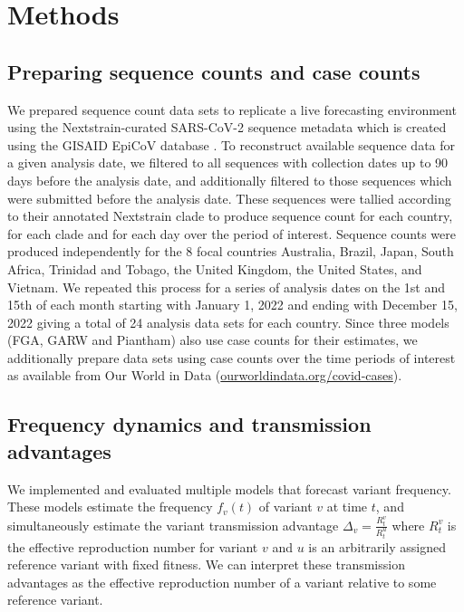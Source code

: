 \documentclass[10pt,letterpaper]{article}
\begin{document}
\section*{Methods}

\subsection*{Preparing sequence counts and case counts}

We prepared sequence count data sets to replicate a live forecasting environment using the Nextstrain-curated SARS-CoV-2 sequence metadata \cite{hadfield2018nextstrain} which is created using the GISAID EpiCoV database \cite{khare2021gisaid}.
To reconstruct available sequence data for a given analysis date, we filtered to all sequences with collection dates up to 90 days before the analysis date, and additionally filtered to those sequences which were submitted before the analysis date.
These sequences were tallied according to their annotated Nextstrain clade to produce sequence count for each country, for each clade and for each day over the period of interest.
Sequence counts were produced independently for the 8 focal countries Australia, Brazil, Japan, South Africa, Trinidad and Tobago, the United Kingdom, the United States, and Vietnam.
We repeated this process for a series of analysis dates on the 1st and 15th of each month starting with January 1, 2022 and ending with December 15, 2022 giving a total of 24 analysis data sets for each country.
Since three models (FGA, GARW and Piantham) also use case counts for their estimates, we additionally prepare data sets using case counts over the time periods of interest as available from Our World in Data (\href{https://ourworldindata.org/covid-cases}{ourworldindata.org/covid-cases}).

\subsection*{Frequency dynamics and transmission advantages}

We implemented and evaluated multiple models that forecast variant frequency.
These models estimate the frequency $f_{v}(t)$ of variant $v$ at time $t$, and simultaneously estimate the variant transmission advantage $\Delta_{v} = \frac{R_{t}^{v}}{R_{t}^{u}}$ where $R_{t}^{v}$ is the effective reproduction number for variant $v$ and $u$ is an arbitrarily assigned reference variant with fixed fitness.
We can interpret these transmission advantages as the effective reproduction number of a variant relative to some reference variant.
\end{document}
